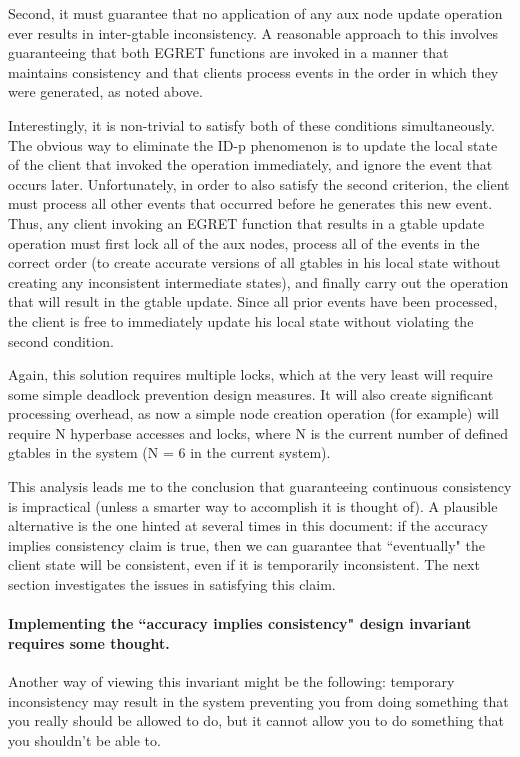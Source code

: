 Second, it must guarantee that no application of any aux node 
update operation ever results in inter-gtable inconsistency.  A 
reasonable approach to this involves guaranteeing that both EGRET 
functions are invoked in a manner that maintains consistency and 
that clients process events in the order in which they were 
generated, as noted above.

Interestingly, it is non-trivial to satisfy both of these conditions
simultaneously.  The obvious way to eliminate the ID-p phenomenon is
to update the local state of the client that invoked the operation
immediately, and ignore the event that occurs later.  Unfortunately,
in order to also satisfy the second criterion, the client must process
all other events that occurred before he generates this new event.
Thus, any client invoking an EGRET function that results in a gtable
update operation must first lock all of the aux nodes, process all of
the events in the correct order (to create accurate versions of all
gtables in his local state without creating any inconsistent
intermediate states), and finally carry out the operation that will
result in the gtable update.  Since all prior events have been
processed, the client is free to immediately update his local state
without violating the second condition.

Again, this solution requires multiple locks, which at the very least
will require some simple deadlock prevention design measures.  It will
also create significant processing overhead, as now a simple node
creation operation (for example) will require N hyperbase accesses and
locks, where N is the current number of defined gtables in the system
(N = 6 in the current system).

This analysis leads me to the conclusion that guaranteeing continuous
consistency is impractical (unless a smarter way to accomplish it is
thought of).  A plausible alternative is the one hinted at several
times in this document: if the accuracy implies consistency claim is
true, then we can guarantee that ``eventually" the client state will be
consistent, even if it is temporarily inconsistent.  The next section
investigates the issues in satisfying this claim.

\paragraph {Implementing the ``accuracy implies consistency" design invariant 
requires some thought.}

Another way of viewing this invariant might be the following:
temporary inconsistency may result in the system preventing you from
doing something that you really should be allowed to do, but it cannot
allow you to do something that you shouldn't be able to.

